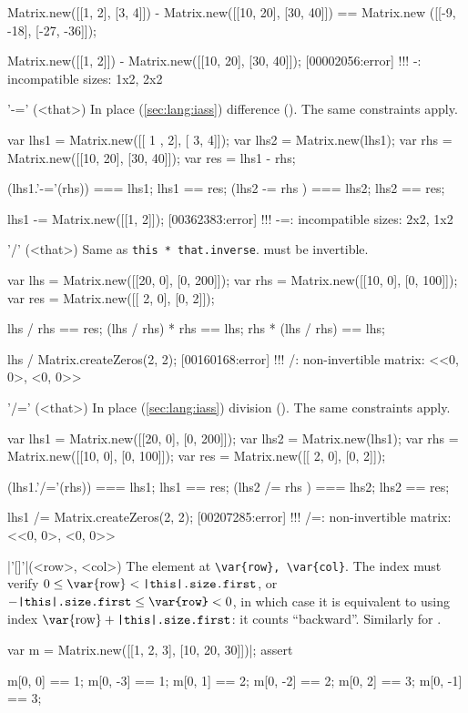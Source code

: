 \begin{urbiscriptapi}
\begin{urbiassert}
Matrix.new([[1, 2], [3, 4]]) - Matrix.new([[10, 20], [30, 40]])
  == Matrix.new ([[-9, -18], [-27, -36]]);

Matrix.new([[1, 2]]) - Matrix.new([[10, 20], [30, 40]]);
[00002056:error] !!! -: incompatible sizes: 1x2, 2x2
\end{urbiassert}



\item['-='](<that>)%
  In place (\autoref{sec:lang:iass}) difference ().  The same
  constraints apply.
\begin{urbiassert}
var lhs1 = Matrix.new([[ 1 , 2], [ 3,  4]]);
var lhs2 = Matrix.new(lhs1);
var rhs = Matrix.new([[10, 20], [30, 40]]);
var res = lhs1 - rhs;

(lhs1.'-='(rhs)) === lhs1;  lhs1 == res;
(lhs2  -=  rhs ) === lhs2;  lhs2 == res;

lhs1 -= Matrix.new([[1, 2]]);
[00362383:error] !!! -=: incompatible sizes: 2x2, 1x2
\end{urbiassert}


\item['/'](<that>)%
  Same as \lstinline|this * that.inverse|.  \that must be invertible.
\begin{urbiassert}
var lhs = Matrix.new([[20, 0], [0, 200]]);
var rhs = Matrix.new([[10, 0], [0, 100]]);
var res = Matrix.new([[ 2, 0], [0,   2]]);

lhs / rhs == res;
(lhs / rhs) * rhs == lhs;
rhs * (lhs / rhs) == lhs;

lhs / Matrix.createZeros(2, 2);
[00160168:error] !!! /: non-invertible matrix: <<0, 0>, <0, 0>>
\end{urbiassert}


\item['/='](<that>)%
  In place (\autoref{sec:lang:iass}) division ().  The same
  constraints apply.
\begin{urbiassert}
var lhs1 = Matrix.new([[20, 0], [0, 200]]);
var lhs2 = Matrix.new(lhs1);
var rhs = Matrix.new([[10, 0], [0, 100]]);
var res = Matrix.new([[ 2, 0], [0,   2]]);

(lhs1.'/='(rhs)) === lhs1;  lhs1 == res;
(lhs2  /=  rhs ) === lhs2;  lhs2 == res;

lhs1 /= Matrix.createZeros(2, 2);
[00207285:error] !!! /=: non-invertible matrix: <<0, 0>, <0, 0>>
\end{urbiassert}


\item|'[]'|(<row>, <col>)%
  The element at \lstinline|\var{row}, \var{col}|.  The index  must
  verify $0 \le \textrm{\var{row}} < \texttt{\this.size.first}$, or
  $-\texttt{\this.size.first} \le \texttt{\var{row}} < 0$, in which case it
  is equivalent to using index $\textrm{\var{row}} +
  \texttt{\this.size.first}$: it counts ``backward''.  Similarly for
  .
\begin{urbiscript}
var m = Matrix.new([[1, 2, 3], [10, 20, 30]])|;
assert
{
  m[0, 0] == 1;   m[0, -3] == 1;
  m[0, 1] == 2;   m[0, -2] == 2;
  m[0, 2] == 3;   m[0, -1] == 3;

}
\end{urbiscript}
\end{urbiscriptapi}
